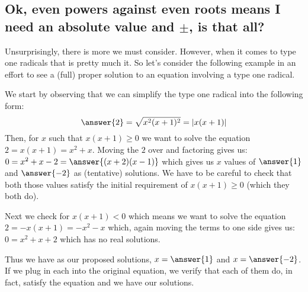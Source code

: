 \documentclass{ximera}
\begin{document}
\subsection*{Ok, even powers against even roots means I need an absolute value and $\pm$, is that all?}

    Unsurprisingly, there is more we must consider. However, when it comes to type one radicals that is pretty much it. So let's consider the following example in an effort to see a (full) proper solution to an equation involving a type one radical.

    \begin{example}[Find all real values of $x$ so that $\sqrt{x^2(x+1)^2} = 2$]%
        We start by observing that we can simplify the type one radical into the following form:
        \[
            \answer{2} = \sqrt{x^2(x+1)^2} = |x(x+1)|
        \]
        Then, for $x$ such that $x(x+1) \geq 0$ we want to solve the equation $2 = x(x+1) = x^2 + x$. Moving the $2$ over and factoring gives us: $0 = x^2 + x - 2 = \answer{(x + 2)(x - 1)}$ which gives us $x$ values of $\answer{1}$ and $\answer{-2}$ as (tentative) solutions. We have to be careful to check that both those values satisfy the initial requirement of $x(x+1) \geq 0$ (which they both do).
        
        Next we check for $x(x+1) < 0$ which means we want to solve the equation $2 = -x(x+1) = -x^2 - x$ which, again moving the terms to one side gives us: $0 = x^2 + x + 2$ which has no real solutions.

        Thus we have as our proposed solutions, $x = \answer{1}$ and $x = \answer{-2}$. If we plug in each into the original equation, we verify that each of them do, in fact, satisfy the equation and we have our solutions.
    \end{example}%
%
%
%
%
%
%
\end{document}
